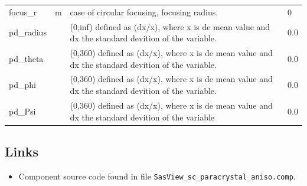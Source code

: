 \begin{longtable}{p{}p{}p{}p{}}
focus\_r & m & case of circular focusing, focusing radius. & 0 \\
pd\_radius &  & (0,inf) defined as (dx/x), where x is de mean value and dx the standard devition of the variable. & 0.0 \\
pd\_theta &  & (0,360) defined as (dx/x), where x is de mean value and dx the standard devition of the variable. & 0.0 \\
pd\_phi &  & (0,360) defined as (dx/x), where x is de mean value and dx the standard devition of the variable. & 0.0 \\
pd\_Psi &  & (0,360) defined as (dx/x), where x is de mean value and dx the standard devition of the variable & 0.0 \\
\bottomrule
\end{longtable}

\subsection*{Links}
\begin{itemize}
  \item Component source code found in file \texttt{SasView\_sc\_paracrystal\_aniso.comp}.
\end{itemize}
